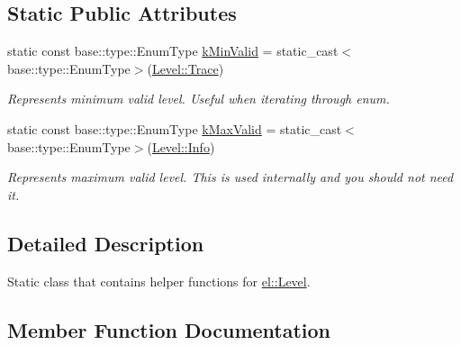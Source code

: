 \subsection*{Static Public Attributes}
\begin{DoxyCompactItemize}
\item 
static const base\+::type\+::\+Enum\+Type \hyperlink{classel_1_1LevelHelper_a3ecfe43d5b242e9946bad7f61ea4d89d}{k\+Min\+Valid} = static\+\_\+cast$<$base\+::type\+::\+Enum\+Type$>$(\hyperlink{namespaceel_ab0ac6091262344c52dd2d3ad099e8e36add4ec0ac4e58f7c32a01244ae91150b1}{Level\+::\+Trace})\hypertarget{classel_1_1LevelHelper_a3ecfe43d5b242e9946bad7f61ea4d89d}{}\label{classel_1_1LevelHelper_a3ecfe43d5b242e9946bad7f61ea4d89d}

\begin{DoxyCompactList}\small\item\em Represents minimum valid level. Useful when iterating through enum. \end{DoxyCompactList}\item 
static const base\+::type\+::\+Enum\+Type \hyperlink{classel_1_1LevelHelper_aa06e80c65db5c336c4aad25872cf9a48}{k\+Max\+Valid} = static\+\_\+cast$<$base\+::type\+::\+Enum\+Type$>$(\hyperlink{namespaceel_ab0ac6091262344c52dd2d3ad099e8e36a4059b0251f66a18cb56f544728796875}{Level\+::\+Info})\hypertarget{classel_1_1LevelHelper_aa06e80c65db5c336c4aad25872cf9a48}{}\label{classel_1_1LevelHelper_aa06e80c65db5c336c4aad25872cf9a48}

\begin{DoxyCompactList}\small\item\em Represents maximum valid level. This is used internally and you should not need it. \end{DoxyCompactList}\end{DoxyCompactItemize}


\subsection{Detailed Description}
Static class that contains helper functions for \hyperlink{namespaceel_ab0ac6091262344c52dd2d3ad099e8e36}{el\+::\+Level}. 

\subsection{Member Function Documentation}
